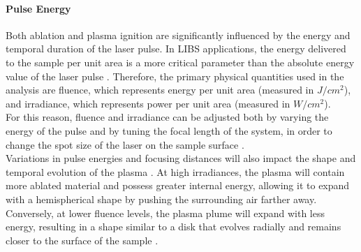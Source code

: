 \paragraph{Pulse Energy}
\label{par:pulse_energy_setup_component}
Both ablation and plasma ignition are significantly influenced by the energy and temporal duration of the laser pulse. In LIBS applications, the energy delivered to the sample per unit area is a more critical parameter than the absolute energy value of the laser pulse \cite{maoLaserAblationProcesses1998}. Therefore, the primary physical quantities used in the analysis are fluence, which represents energy per unit area (measured in $J/cm^2$), and irradiance, which represents power per unit area (measured in $W/cm^2$).
\\
For this reason, fluence and irradiance can be adjusted both by varying the energy of the pulse and by tuning the focal length of the system, in order to change the spot size of the laser on the sample surface \cite{abdelhamidEffectChangingLaser2009}.
\\
Variations in pulse energies and focusing distances will also impact the shape and temporal evolution of the plasma \cite{sarkarStudiesNsIRLaserInducedPlasma2011}. At high irradiances, the plasma will contain more ablated material and possess greater internal energy, allowing it to expand with a hemispherical shape by pushing the surrounding air farther away. Conversely, at lower fluence levels, the plasma plume will expand with less energy, resulting in a shape similar to a disk that evolves radially and remains closer to the surface of the sample \cite{fortesLaserinducedBreakdownSpectroscopy2013}.

